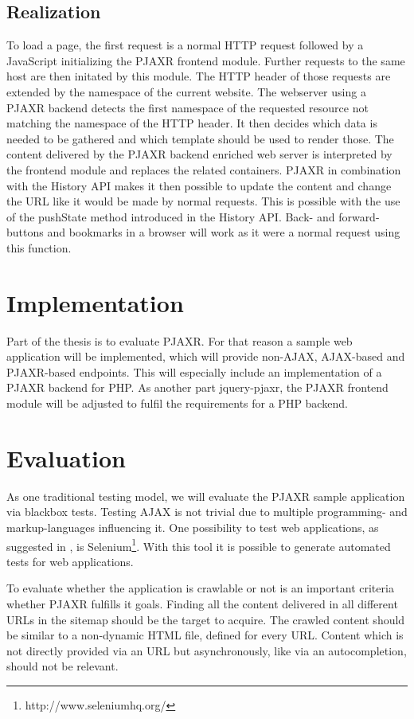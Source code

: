 \documentclass[f,bachelor,binding,twoside,palatino]{WeSTthesis}
\def \ajax {AJAX}
\def \pjaxr {PJAXR}
\def \jqueryPjaxr {jquery-pjaxr}
\def \httpRequest {HTTP request}
\begin{document}
  \subsection{Realization}
  To load a page, the first request is a normal \httpRequest{} followed by a JavaScript initializing the \pjaxr{} frontend module.
  Further requests to the same host are then initated by this module.
  The HTTP header of those requests are extended by the namespace of the current website.
  The webserver using a \pjaxr{} backend detects the first namespace of the requested resource not matching the namespace of the HTTP header.
  It then decides which data is needed to be gathered and which template should be used to render those.
  The content delivered by the \pjaxr{} backend enriched web server is interpreted by the frontend module and replaces the related containers.
  \pjaxr{} in combination with the History API makes it then possible to update the content and change the URL like it would be made by normal requests.
  This is possible with the use of the pushState method introduced in the History API.
  Back- and forward-buttons and bookmarks in a browser will work as it were a normal request using this function.
  
\section{Implementation}
  Part of the thesis is to evaluate \pjaxr{}. For that reason a sample web application will be implemented, which will provide non-\ajax{}, \ajax{}-based and \pjaxr{}-based endpoints.
  This will especially include an implementation of a \pjaxr{} backend for PHP. As another part \jqueryPjaxr{}, the \pjaxr{} frontend module will be adjusted to fulfil the requirements for a PHP backend.

\section{Evaluation}
  As one traditional testing model, we will evaluate the \pjaxr{} sample application via blackbox tests.
  Testing \ajax{} is not trivial due to multiple programming- and markup-languages influencing it. 
  One possibility to test web applications, as suggested in \cite{lundmark11}, is Selenium\footnote{http://www.seleniumhq.org/}.
  With this tool it is possible to generate automated tests for web applications.

  To evaluate whether the application is crawlable or not is an important criteria whether \pjaxr{} fulfills it goals.
  Finding all the content delivered in all different URLs in the sitemap should be the target to acquire.
  The crawled content should be similar to a non-dynamic HTML file, defined for every URL.
  Content which is not directly provided via an URL but asynchronously, like via an autocompletion, should not be relevant.
\end{document}
